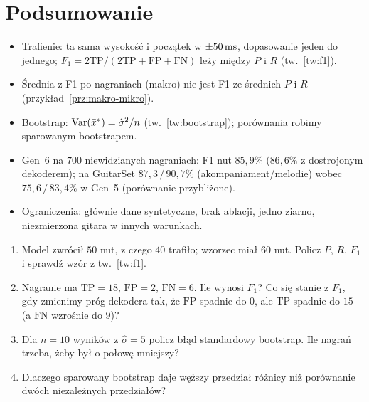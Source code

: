 \section*{Podsumowanie}
\begin{itemize}
\item Trafienie: ta sama wysokość i początek w $\pm50\,\mathrm{ms}$, dopasowanie jeden do jednego; $F_1=2\mathrm{TP}/(2\mathrm{TP}+\mathrm{FP}+\mathrm{FN})$ leży między $P$ i $R$ (tw.~\ref{tw:f1}).
\item Średnia z F1 po nagraniach (makro) nie jest F1 ze średnich $P$ i $R$ (przykład~\ref{prz:makro-mikro}).
\item Bootstrap: $\operatorname{Var}(\bar x^\ast)=\hat\sigma^2/n$ (tw.~\ref{tw:bootstrap}); porównania robimy sparowanym bootstrapem.
\item Gen~6 na $700$ niewidzianych nagraniach: F1 nut $85{,}9\%$ ($86{,}6\%$ z dostrojonym dekoderem); na GuitarSet $87{,}3\,/\,90{,}7\%$ (akompaniament/melodie) wobec $75{,}6\,/\,83{,}4\%$ w Gen~5 (porównanie przybliżone).
\item Ograniczenia: głównie dane syntetyczne, brak ablacji, jedno ziarno, niezmierzona gitara w innych warunkach.
\end{itemize}

\begin{sprawdz}
\begin{enumerate}
\item Model zwrócił $50$ nut, z czego $40$ trafiło; wzorzec miał $60$ nut. Policz $P$, $R$, $F_1$ i sprawdź wzór z tw.~\ref{tw:f1}.
\item Nagranie ma $\mathrm{TP}=18$, $\mathrm{FP}=2$, $\mathrm{FN}=6$. Ile wynosi $F_1$? Co się stanie z $F_1$, gdy zmienimy próg dekodera tak, że $\mathrm{FP}$ spadnie do $0$, ale $\mathrm{TP}$ spadnie do $15$ (a $\mathrm{FN}$ wzrośnie do $9$)?
\item Dla $n=10$ wyników z $\hat\sigma=5$ policz błąd standardowy bootstrap. Ile nagrań trzeba, żeby był o połowę mniejszy?
\item Dlaczego sparowany bootstrap daje węższy przedział różnicy niż porównanie dwóch niezależnych przedziałów?
\end{enumerate}
\end{sprawdz}

